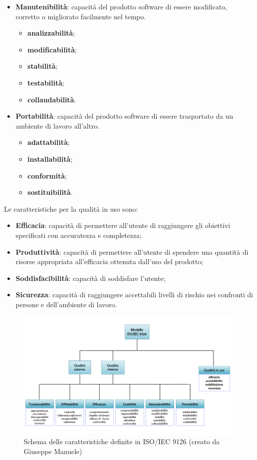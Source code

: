 \begin{itemize}
\begin{itemize}
	\end{itemize}
\item \textbf{Manutenibilità}: capacità del prodotto software di essere modificato, corretto o migliorato facilmente nel tempo.
	\begin{itemize}
	\item \textbf{analizzabilità};
	\item \textbf{modificabilità};
	\item \textbf{stabilità};
	\item \textbf{testabilità};
	\item \textbf{collaudabilità}.
	\end{itemize}
\item \textbf{Portabilità}: capacità del prodotto software di essere trasportato da un ambiente di lavoro all'altro.
	\begin{itemize}
	\item \textbf{adattabilità};
	\item \textbf{installabilità};
	\item \textbf{conformità};
	\item \textbf{sostituibilità}.
	\end{itemize}
\end{itemize}

Le caratteristiche per la qualità in uso sono:
\begin{itemize}
\item \textbf{Efficacia}: capacità di permettere all'utente di raggiungere gli obiettivi specificati con accuratezza e completezza;
\item \textbf{Produttività}: capacità di permettere all'utente di spendere una quantità di risorse appropriata all'efficacia ottenuta dall'uso del prodotto;
\item \textbf{Soddisfacibilità}: capacità di soddisfare l'utente;
\item \textbf{Sicurezza}: capacità di raggiungere accettabili livelli di rischio nei confronti di persone e dell'ambiente di lavoro.
\end{itemize}

\begin{figure}[httb]
\centering
\includegraphics[scale=0.5]{./img/ISO-IEC_9126_schema.png}
\caption[Schema delle caratteristiche definite in ISO/IEC 9126]{Schema delle caratteristiche definite in ISO/IEC 9126 (creato da Giuseppe Manuele)}
\end{figure}